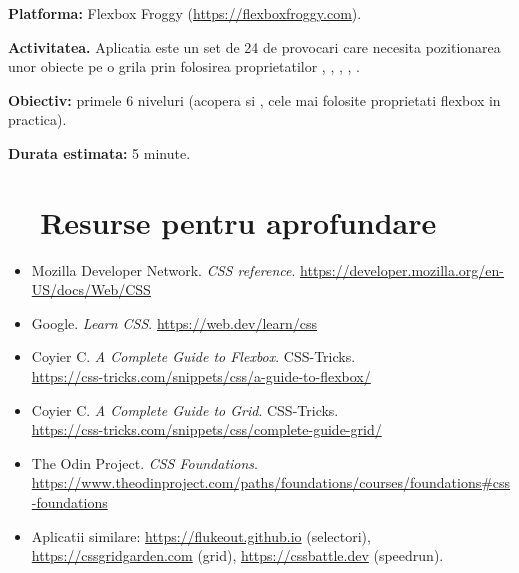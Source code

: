 \begin{joc}
\textbf{Platforma:} Flexbox Froggy (\url{https://flexboxfroggy.com}).

\medskip

\textbf{Activitatea.} Aplicatia este un set de 24 de provocari care necesita pozitionarea unor obiecte pe o grila prin folosirea proprietatilor , , , , .

\medskip

\textbf{Obiectiv:} primele 6 niveluri (acopera  si , cele mai folosite proprietati flexbox in practica).

\medskip

\textbf{Durata estimata:} 5 minute.
\end{joc}

\section*{\faGraduationCap\ \ Resurse pentru aprofundare}

\begin{itemize}[itemsep=2pt]
  \item Mozilla Developer Network. \emph{CSS reference}. \url{https://developer.mozilla.org/en-US/docs/Web/CSS}
  \item Google. \emph{Learn CSS}. \url{https://web.dev/learn/css}
  \item Coyier C. \emph{A Complete Guide to Flexbox}. CSS-Tricks. \\\url{https://css-tricks.com/snippets/css/a-guide-to-flexbox/}
  \item Coyier C. \emph{A Complete Guide to Grid}. CSS-Tricks. \\\url{https://css-tricks.com/snippets/css/complete-guide-grid/}
  \item The Odin Project. \emph{CSS Foundations}. \\\url{https://www.theodinproject.com/paths/foundations/courses/foundations\#css-foundations}
  \item Aplicatii similare: \url{https://flukeout.github.io} (selectori), \url{https://cssgridgarden.com} (grid), \url{https://cssbattle.dev} (speedrun).
\end{itemize}

\bigskip

